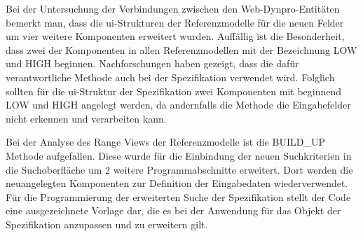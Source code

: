 Bei der Untersuchung der Verbindungen zwischen den Web-Dynpro-Entitäten bemerkt man, dass die \ac{ui}-Strukturen der Referenzmodelle für die neuen Felder um vier weitere Komponenten erweitert wurden. Auffällig ist die Besonderheit, dass zwei der Komponenten in allen Referenzmodellen mit der Bezeichnung LOW und HIGH beginnen. Nachforschungen haben gezeigt, dass die dafür verantwortliche Methode auch bei der Spezifikation verwendet wird. Folglich sollten für die \ac{ui}-Struktur der Spezifikation zwei Komponenten mit beginnend LOW und HIGH angelegt werden, da andernfalls die Methode die Eingabefelder nicht erkennen und verarbeiten kann.



Bei der Analyse des Range Views der Referenzmodelle ist die BUILD\_UP Methode aufgefallen. Diese wurde für die Einbindung der neuen Suchkriterien in die Suchoberfläche um 2 weitere Programmabschnitte erweitert. Dort werden die neuangelegten Komponenten zur Definition der Eingabedaten wiederverwendet. Für die Programmierung der erweiterten Suche der Spezifikation stellt der Code eine ausgezeichnete Vorlage dar, die es bei der Anwendung für das Objekt der Spezifikation anzupassen und zu erweitern gilt. 

